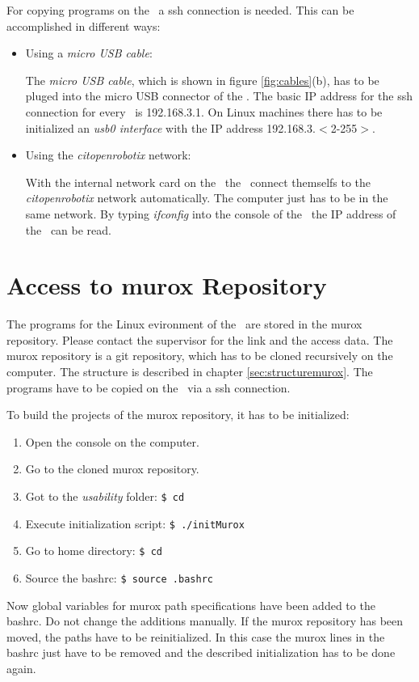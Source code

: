For copying programs on the \cognition\ a ssh connection is needed. This can be accomplished in different ways:
\begin{itemize}
\item Using a {\it micro USB cable}:

The {\it micro USB cable}, which is shown in figure \ref{fig:cables}(b), has to be pluged into the micro USB connector of the \cognition. The basic IP address for the ssh connection for every \amiro\ is 192.168.3.1. On Linux machines there has to be initialized an {\it usb0 interface} with the IP address 192.168.3.$<$2-255$>$.

\item Using the {\it citopenrobotix} network:

With the internal network card on the \cognition\ the \amiros\ connect themselfs to the {\it citopenrobotix} network automatically. The computer just has to be in the same network. By typing {\it ifconfig} into the console of the \cognition\ the IP address of the \amiro\ can be read.
\end{itemize}

\section{Access to murox Repository}

The programs for the Linux evironment of the \cognition\ are stored in the murox repository. Please contact the supervisor for the link and the access data. The murox repository is a git repository, which has to be cloned recursively on the computer. The structure is described in chapter \ref{sec:structuremurox}. The programs have to be copied on the \cognition\ via a ssh connection.

To build the projects of the murox repository, it has to be initialized:
\begin{enumerate}
\item Open the console on the computer.
\item Go to the cloned murox repository.
\item Got to the {\it usability} folder: {\tt\$ cd \utilitypath}
\item Execute initialization script: {\tt\$ ./initMurox}
\item Go to home directory: {\tt\$ cd}
\item Source the bashrc: {\tt\$ source .bashrc}
\end{enumerate}
Now global variables for murox path specifications have been added to the bashrc. Do not change the additions manually. If the murox repository has been moved, the paths have to be reinitialized. In this case the murox lines in the bashrc just have to be removed and the described initialization has to be done again.

